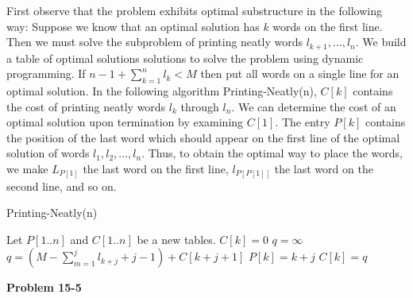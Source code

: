 \documentclass{article}
\begin{document}
First observe that the problem exhibits optimal substructure in the following way: Suppose we know that an optimal solution has $k$ words on the first line.  Then we must solve the subproblem of printing neatly words $l_{k+1}, \ldots, l_{n}$.  We build a table of optimal solutions solutions to solve the problem using dynamic programming.  If $n-1 + \sum_{k=1}^nl_k < M$ then put all words on a single line for an optimal solution.  In the following algorithm Printing-Neatly(n), $C[k]$ contains the cost of printing neatly words $l_k$ through $l_n$. We can determine the cost of an optimal solution upon termination by examining $C[1]$.  The entry $P[k]$ contains the position of the last word which should appear on the first line of the optimal solution of words $l_1, l_2, \ldots, l_n$.  Thus, to obtain the optimal way to place the words, we make $L_{P[1]}$ the last word on the first line, $l_{P[P[1]]}$ the last word on the second line, and so on.\\

\begin{algorithm}
\caption{Printing-Neatly(n)}
\begin{algorithmic}[1]
\State Let $P[1..n]$ and $C[1..n]$ be a new tables.
		\State $C[k] = 0$
	\EndIf
	\State $q = \infty$
			\State $q = (M - \sum_{m=1}^j l_{k+j} + j - 1) + C[k + j + 1]$
			\State $P[k] = k+j$
		\EndIf
	\EndFor
	\State $C[k] = q$
\EndFor
\end{algorithmic}
\end{algorithm}

\noindent\textbf{Problem 15-5}\\
\end{document}
